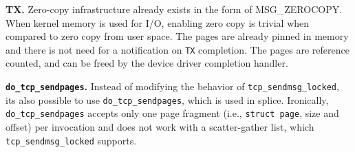 \noindent \textbf{TX.} Zero-copy infrastructure already exists in the form of MSG\_ZEROCOPY\cite{desendmsg}. When kernel memory is used for I/O, enabling zero copy is trivial when compared to zero copy from user space. The pages are already pinned in memory and there is not need for a notification on \texttt{TX} completion. The pages are reference counted, and can be freed by the device driver completion handler.


\noindent \textbf{\texttt{do\_tcp\_sendpages}.}
Instead of modifying the behavior of \texttt{tcp\_sendmsg\_locked}, its also possible to use \texttt{do\_tcp\_sendpages}, which is used in splice. Ironically, \texttt{do\_tcp\_sendpages} accepts only one page fragment (i.e., \texttt{struct page}, size and offset) per invocation and does not work with a scatter-gather list, which \texttt{tcp\_sendmsg\_locked} supports.

